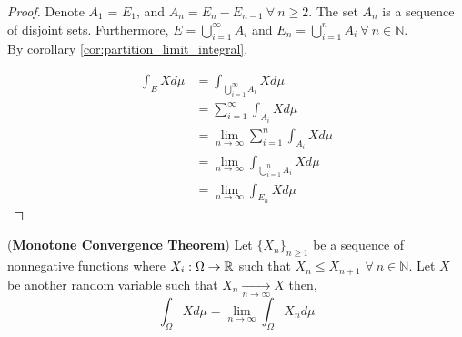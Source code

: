 \documentclass[../TGMAFFIRO.tex]{subfiles}
\begin{document}
\begin{proof}
	Denote $A_1$ = $E_1$, and $A_n = E_n - E_{n-1} \ \forall \ n \geq 2$. The set $A_n$ is a sequence of disjoint sets. Furthermore, $E = \bigcup_{i=1}^\infty A_i$ and $E_n = \bigcup_{i=1}^n A_i \ \forall \ n \in \mathbb{N}$.\\
	
	By corollary \ref{cor:partition_limit_integral},
	
	\begin{align*}
		\int_E X d\mu &= \int_{\bigcup_{i=1}^{\infty} A_i} X d\mu \\
		&= \sum_{i=1}^{\infty} \int_{A_i} X d\mu \\
		&= \lim_{n\to\infty} \sum_{i=1}^{n} \int_{A_i} X d\mu \\ 
		&= \lim_{n\to\infty} \int_{\bigcup_{i=1}^{n} A_i} X d\mu \\
		&= \lim_{n\to\infty} \int_{E_n} X d\mu
	\end{align*}
\end{proof}


\begin{theorem} (\textbf{Monotone Convergence Theorem})
Let $\{X_n\}_{n\geq 1}$ be a sequence of nonnegative functions where $X_i: \Omega \to \mathbb{R}$ such that $X_n \leq X_{n+1}$ $\forall \ n \in \mathbb{N}$. Let $X$ be another random variable such that $X_n \xrightarrow[n \to \infty]{}X$ then,
\begin{equation}
	\int_\Omega X d\mu = \lim_{n\to \infty} \int_\Omega X_n d\mu
\end{equation}
\end{theorem}
\end{document}
